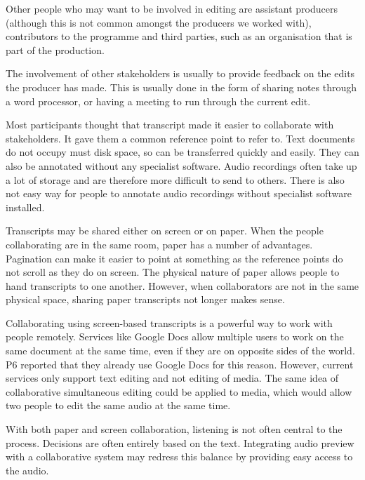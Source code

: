 Other people who may want to be involved in editing are assistant producers (although this is not common amongst the
producers we worked with), contributors to the programme and third parties, such as an organisation that is part of the
production.

The involvement of other stakeholders is usually to provide feedback on the edits the producer has made. This is
usually done in the form of sharing notes through a word processor, or having a meeting to run through the current
edit.


Most participants thought that transcript made it easier to collaborate with stakeholders. It gave them a common
reference point to refer to. Text documents do not occupy must disk space, so can be transferred quickly and easily.
They can also be annotated without any specialist software. Audio recordings often take up a lot of storage and are
therefore more difficult to send to others. There is also not easy way for people to annotate audio recordings without
specialist software installed.


Transcripts may be shared either on screen or on paper. When the people collaborating are in the same room, paper has a
number of advantages. Pagination can make it easier to point at something as the reference points do not scroll as they
do on screen. The physical nature of paper allows people to hand transcripts to one another. However, when
collaborators are not in the same physical space, sharing paper transcripts not longer makes sense.


Collaborating using screen-based transcripts is a powerful way to work with people remotely. Services like Google Docs
allow multiple users to work on the same document at the same time, even if they are on opposite sides of the world. P6
reported that they already use Google Docs for this reason. However, current services only support text editing and not
editing of media. The same idea of collaborative simultaneous editing could be applied to media, which would allow two
people to edit the same audio at the same time.


With both paper and screen collaboration, listening is not often central to the process. Decisions are often entirely
based on the text. Integrating audio preview with a collaborative system may redress this balance by providing easy
access to the audio.

